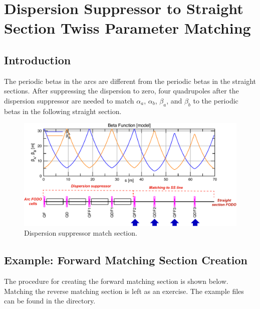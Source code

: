 \documentclass{hitec}     %
\begin{document}
{%
\section{Dispersion Suppressor to Straight Section Twiss Parameter Matching}

\subsection{Introduction}

The periodic betas in the arcs are different from the periodic betas in the straight sections. After suppressing the dispersion to zero, four quadrupoles after the dispersion suppressor are needed to match $\alpha_a$, $\alpha_b$, $\beta_a$, and $\beta_b$ to the periodic betas in the following straight section.
\begin{figure}[!h]
    \centering
    \includegraphics[width=1\linewidth]{figures/match.pdf}
    \caption{Dispersion suppressor match section.}
    \label{f:match}
\end{figure}

\subsection{Example: Forward Matching Section Creation}

The procedure for creating the forward matching section is shown below.
Matching the reverse matching section is left as an exercise. 
The example files can be found in the  directory.

}
\end{document}
